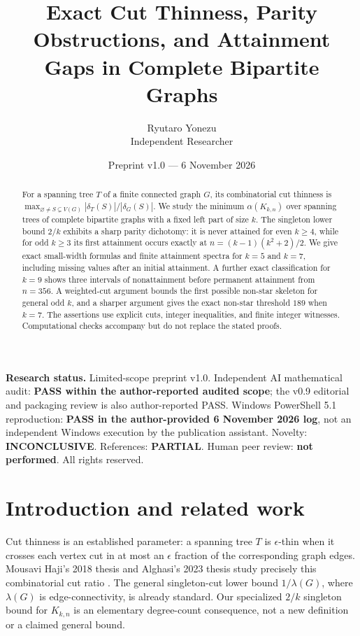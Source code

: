 \documentclass[11pt,a4paper]{article}
\title{\bfseries Exact Cut Thinness, Parity Obstructions, and Attainment Gaps in Complete Bipartite Graphs}
\author{Ryutaro Yonezu\\\small Independent Researcher}
\date{Preprint v1.0 --- 6 November 2026}
\newcommand{\al}{\alpha}
\newcommand{\del}{\delta}
\newcommand{\KK}[2]{K_{#1,#2}}
\begin{document}
\maketitle
\begin{abstract}
For a spanning tree $T$ of a finite connected graph $G$, its combinatorial cut thinness is $\max_{\varnothing\ne S\subsetneq V(G)}|\del_T(S)|/|\del_G(S)|$. We study the minimum $\al(\KK{k}{n})$ over spanning trees of complete bipartite graphs with a fixed left part of size $k$. The singleton lower bound $2/k$ exhibits a sharp parity dichotomy: it is never attained for even $k\ge4$, while for odd $k\ge3$ its first attainment occurs exactly at $n=(k-1)(k^2+2)/2$. We give exact small-width formulas and finite attainment spectra for $k=5$ and $k=7$, including missing values after an initial attainment. A further exact classification for $k=9$ shows three intervals of nonattainment before permanent attainment from $n=356$. A weighted-cut argument bounds the first possible non-star skeleton for general odd $k$, and a sharper argument gives the exact non-star threshold $189$ when $k=7$. The assertions use explicit cuts, integer inequalities, and finite integer witnesses. Computational checks accompany but do not replace the stated proofs.
\end{abstract}
\noindent\textbf{Research status.} Limited-scope preprint v1.0. Independent AI mathematical audit: \textbf{PASS within the author-reported audited scope}; the v0.9 editorial and packaging review is also author-reported PASS. Windows PowerShell 5.1 reproduction: \textbf{PASS in the author-provided 6 November 2026 log}, not an independent Windows execution by the publication assistant. Novelty: \textbf{INCONCLUSIVE}. References: \textbf{PARTIAL}. Human peer review: \textbf{not performed}. All rights reserved.

\section{Introduction and related work}
Cut thinness is an established parameter: a spanning tree $T$ is $\epsilon$-thin when it crosses each vertex cut in at most an $\epsilon$ fraction of the corresponding graph edges. Mousavi Haji's 2018 thesis and Alghasi's 2023 thesis study precisely this combinatorial cut ratio \cite{mousavithesis,alghasi}. The general singleton-cut lower bound $1/\lambda(G)$, where $\lambda(G)$ is edge-connectivity, is already standard. Our specialized $2/k$ singleton bound for $\KK{k}{n}$ is an elementary degree-count consequence, not a new definition or a claimed general bound.
\end{document}
